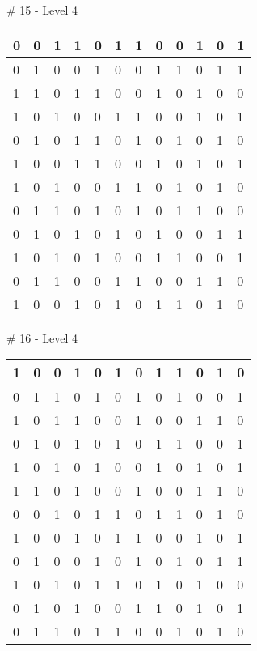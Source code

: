 \smallskip

\# 15 - Level 4 \newline
\begin{tabular}{|m{\collen}|m{\collen}|m{\collen}|m{\collen}|m{\collen}|m{\collen}|m{\collen}|m{\collen}|m{\collen}|m{\collen}|m{\collen}|m{\collen}|}
\hline
  0 & 0 & 1 & 1 & 0 & 1 & 1 & 0 & 0 & 1 & 0 & 1 \\
\hline
  0 & 1 & 0 & 0 & 1 & 0 & 0 & 1 & 1 & 0 & 1 & 1 \\
\hline
  1 & 1 & 0 & 1 & 1 & 0 & 0 & 1 & 0 & 1 & 0 & 0 \\
\hline
  1 & 0 & 1 & 0 & 0 & 1 & 1 & 0 & 0 & 1 & 0 & 1 \\
\hline
  0 & 1 & 0 & 1 & 1 & 0 & 1 & 0 & 1 & 0 & 1 & 0 \\
\hline
  1 & 0 & 0 & 1 & 1 & 0 & 0 & 1 & 0 & 1 & 0 & 1 \\
\hline
  1 & 0 & 1 & 0 & 0 & 1 & 1 & 0 & 1 & 0 & 1 & 0 \\
\hline
  0 & 1 & 1 & 0 & 1 & 0 & 1 & 0 & 1 & 1 & 0 & 0 \\
\hline
  0 & 1 & 0 & 1 & 0 & 1 & 0 & 1 & 0 & 0 & 1 & 1 \\
\hline
  1 & 0 & 1 & 0 & 1 & 0 & 0 & 1 & 1 & 0 & 0 & 1 \\
\hline
  0 & 1 & 1 & 0 & 0 & 1 & 1 & 0 & 0 & 1 & 1 & 0 \\
\hline
  1 & 0 & 0 & 1 & 0 & 1 & 0 & 1 & 1 & 0 & 1 & 0 \\
\hline
\end{tabular}


\smallskip

\# 16 - Level 4 \newline
\begin{tabular}{|m{\collen}|m{\collen}|m{\collen}|m{\collen}|m{\collen}|m{\collen}|m{\collen}|m{\collen}|m{\collen}|m{\collen}|m{\collen}|m{\collen}|}
\hline
  1 & 0 & 0 & 1 & 0 & 1 & 0 & 1 & 1 & 0 & 1 & 0 \\
\hline
  0 & 1 & 1 & 0 & 1 & 0 & 1 & 0 & 1 & 0 & 0 & 1 \\
\hline
  1 & 0 & 1 & 1 & 0 & 0 & 1 & 0 & 0 & 1 & 1 & 0 \\
\hline
  0 & 1 & 0 & 1 & 0 & 1 & 0 & 1 & 1 & 0 & 0 & 1 \\
\hline
  1 & 0 & 1 & 0 & 1 & 0 & 0 & 1 & 0 & 1 & 0 & 1 \\
\hline
  1 & 1 & 0 & 1 & 0 & 0 & 1 & 0 & 0 & 1 & 1 & 0 \\
\hline
  0 & 0 & 1 & 0 & 1 & 1 & 0 & 1 & 1 & 0 & 1 & 0 \\
\hline
  1 & 0 & 0 & 1 & 0 & 1 & 1 & 0 & 0 & 1 & 0 & 1 \\
\hline
  0 & 1 & 0 & 0 & 1 & 0 & 1 & 0 & 1 & 0 & 1 & 1 \\
\hline
  1 & 0 & 1 & 0 & 1 & 1 & 0 & 1 & 0 & 1 & 0 & 0 \\
\hline
  0 & 1 & 0 & 1 & 0 & 0 & 1 & 1 & 0 & 1 & 0 & 1 \\
\hline
  0 & 1 & 1 & 0 & 1 & 1 & 0 & 0 & 1 & 0 & 1 & 0 \\
\hline
\end{tabular}



